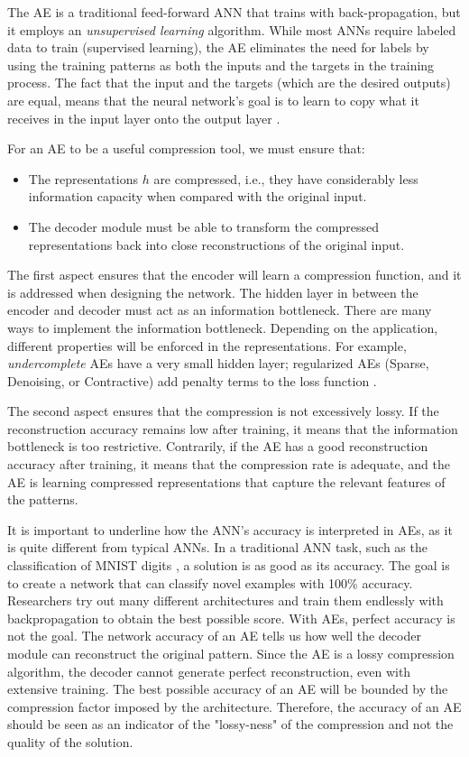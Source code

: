 \documentclass[runningheads]{llncs}
\begin{document}
The AE is a traditional feed-forward ANN that trains with back-propagation, but it employs an \textit{unsupervised learning} algorithm. While most ANNs require labeled data to train (supervised learning), the AE eliminates the need for labels by using the training patterns as both the inputs and the targets in the training process. The fact that the input and the targets (which are the desired outputs) are equal, means that the neural network's goal is to learn to copy what it receives in the input layer onto the output layer \cite{bengio2017deep}.

For an AE to be a useful compression tool, we must ensure that:
\begin{itemize}
    \item The representations $h$ are compressed, i.e., they have considerably less information capacity when compared with the original input.
    \item The decoder module must be able to transform the compressed representations back into close reconstructions of the original input.
\end{itemize}

The first aspect ensures that the encoder will learn a compression function, and it is addressed when designing the network.
The hidden layer in between the encoder and decoder must act as an information bottleneck.
There are many ways to implement the information bottleneck. Depending on the application, different properties will be enforced in the representations. For example, \textit{undercomplete} AEs have a very small hidden layer; regularized AEs (Sparse, Denoising, or Contractive) add penalty terms to the loss function \cite{vincent2010stacked}.

The second aspect ensures that the compression is not excessively lossy. If the reconstruction accuracy remains low after training, it means that the information bottleneck is too restrictive. Contrarily, if the AE has a good reconstruction accuracy after training, it means that the compression rate is adequate, and the AE is learning compressed representations that capture the relevant features of the patterns.

It is important to underline how the ANN's accuracy is interpreted in AEs, as it is quite different from typical ANNs. In a traditional ANN task, such as the classification of MNIST digits \cite{lecun1998mnist}, a solution is as good as its accuracy. The goal is to create a network that can classify novel examples with 100\% accuracy. Researchers try out many different architectures and train them endlessly with backpropagation to obtain the best possible score. 
With AEs, perfect accuracy is not the goal. The network accuracy of an AE tells us how well the decoder module can reconstruct the original pattern. Since the AE is a lossy compression algorithm, the decoder cannot generate perfect reconstruction, even with extensive training. The best possible accuracy of an AE will be bounded by the compression factor imposed by the architecture. Therefore, the accuracy of an AE should be seen as an indicator of the "lossy-ness" of the compression and not the quality of the solution.
\end{document}
